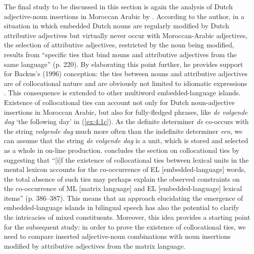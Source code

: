 The final study to be discussed in this section is again the analysis of Dutch adjective-noun insertions in Moroccan Arabic by \citet{boumans-syntax-1998}. According to the author, in a situation in which embedded Dutch nouns are regularly modified by Dutch attributive adjectives but virtually never occur with Moroccan-Arabic adjectives, the selection of attributive adjectives, restricted by the noun being modified, results from ``specific ties that bind nouns and attributive adjectives from the same language'' (p. 220). By elaborating this point further, he provides support for Backus's (1996) conception: the ties between nouns and attributive adjectives are of collocational nature and are obviously not limited to idiomatic expressions \citep[cf.][386--387]{boumans-syntax-1998}. This consequence is extended to other multiword embedded-language islands. Existence of collocational ties can account not only for Dutch noun-adjective insertions in Moroccan Arabic, but also for fully-fledged phrases, like \textit{de volgende dag} `the following day' in (\ref{ex:4:1c}). As the definite determiner \textit{de} co-occurs with the string \textit{volgende dag} much more often than the indefinite determiner \textit{een}, we can assume that the string \textit{de volgende dag} is a unit, which is stored and selected as a whole in on-line production. \citet{boumans-syntax-1998} concludes the section on collocational ties by suggesting that ``[i]f the existence of collocational ties between lexical units in the mental lexicon accounts for the co-occurrence of EL [embedded-language] words, the total absence of such ties may perhaps explain the observed constraints on the co-occurrence of ML [matrix language] and EL [embedded-language] lexical items'' (p. 386--387). This means that an approach elucidating the emergence of embedded-language islands in bilingual speech has also the potential to clarify the intricacies of mixed constituents. Moreover, this idea provides a starting point for the subsequent study: in order to prove the existence of collocational ties, we need to compare inserted adjective-noun combinations with noun insertions modified by attributive adjectives from the matrix language.


